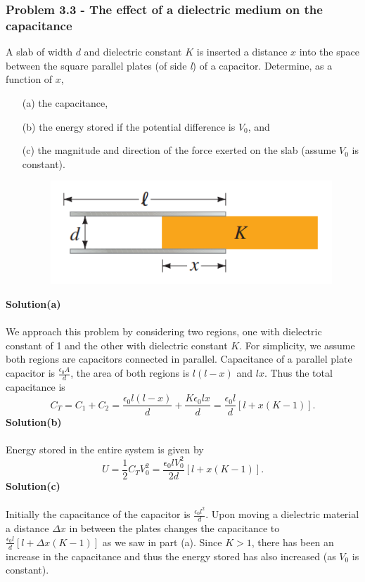\documentclass{article}
\begin{document}
\subsubsection*{Problem 3.3 - The effect of a dielectric medium on the capacitance}
A slab of width $d$ and dielectric constant $K$ is inserted
a distance $x$ into the space between the square parallel
plates (of side \textit{l}) of a capacitor. Determine, as a function of $x$,
\begin{enumerate}
    \item[(a)]the capacitance,
    \item[(b)]the energy stored if the potential difference is $V_0$, and
    \item[(c)]the magnitude and direction of the force exerted on the slab (assume $V_0$ is constant).
    \begin{figure}[h]
    \centering
    \includegraphics[width=0.4\linewidth]{figs/fig_prob_3.3.png}
\end{figure}
\end{enumerate}
\textbf{Solution(a)}
\\
\\We approach this problem by considering two regions, one with dielectric constant of 1 and the other with dielectric constant $K$. For simplicity, we assume both regions are capacitors connected in parallel. Capacitance of a parallel plate capacitor is $\frac{\epsilon_0A}{d}$, the area of both regions is $l(l-x)$ and $lx$. Thus the total capacitance is
\[C_T=C_1+C_2=\frac{\epsilon_0l(l-x)}{d}+\frac{K\epsilon_0lx}{d}=\frac{\epsilon_0l}{d}\left[l+x(K-1)\right].\]
\textbf{Solution(b)}
\\
\\Energy stored in the entire system is given by
\[U=\frac{1}{2}C_TV_0^2=\frac{\epsilon_0lV_0^2}{2d}\left[l+x(K-1)\right].\]
\textbf{Solution(c)}
\\
\\Initially the capacitance of the capacitor is $\frac{\epsilon_0l^2}{d}$. Upon moving a dielectric material a distance $\Delta x$ in between the plates changes the capacitance to $\frac{\epsilon_0l}{d}[l+\Delta x(K-1)]$ as we saw in part (a). Since $K>1$, there has been an increase in the capacitance and thus the energy stored has also increased (as $V_0$ is constant).
\end{document}
